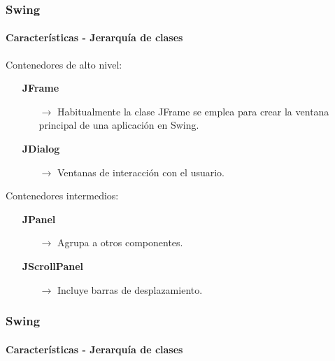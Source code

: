 \documentclass{beamer}
\begin{document}
	\begin{frame}
		\frametitle{Swing}
		\framesubtitle{Caracter\'isticas - Jerarqu\'ia de clases}

		Contenedores de alto nivel:
		\begin{itemize}
		    \item[\checkmark] \textbf{JFrame}
		    \begin{itemize}
        		    \item[$\rightarrow$] Habitualmente la clase JFrame se emplea para crear la ventana principal de una aplicaci\'on en Swing.
        		\end{itemize}
		    \item[\checkmark] \textbf{JDialog}
		    \begin{itemize}
        		    \item[$\rightarrow$] Ventanas de interacci\'on con el usuario.
        		\end{itemize}
		\end{itemize}

		Contenedores intermedios:
		\begin{itemize}
		    \item[\checkmark] \textbf{JPanel}
		    \begin{itemize}
        		    \item[$\rightarrow$] Agrupa a otros componentes.
        		\end{itemize}
		    \item[\checkmark] \textbf{JScrollPanel}
		    \begin{itemize}
        		    \item[$\rightarrow$] Incluye barras de desplazamiento.
        		\end{itemize}
		\end{itemize}
	\end{frame}

    \begin{frame}
		\frametitle{Swing}
		\framesubtitle{Caracter\'isticas - Jerarqu\'ia de clases}
		\begin{center}
		\end{center}
	\end{frame}
\end{document}
